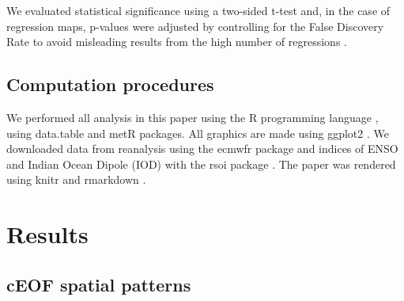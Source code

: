 \documentclass[pdflatex,sn-basic]{sn-jnl}
\theoremstyle{thmstyleone}%
\theoremstyle{thmstyletwo}%
\theoremstyle{thmstylethree}%
\begin{document}
We evaluated statistical significance using a two-sided t-test and, in the case of regression maps, p-values were adjusted by controlling for the False Discovery Rate \citep{benjamini1995, wilks2016} to avoid misleading results from the high number of regressions \citep{walker1914, katz1991}.

\hypertarget{computation-procedures}{%
\subsection{Computation procedures}\label{computation-procedures}}

We performed all analysis in this paper using the R programming language \citep{rcoreteam2020}, using data.table \citep{dowle2020} and metR \citep{campitelli2020} packages.
All graphics are made using ggplot2 \citep{wickham2009}.
We downloaded data from reanalysis using the ecmwfr package \citep{hufkens2020} and indices of ENSO and Indian Ocean Dipole (IOD) with the rsoi package \citep{albers2020}.
The paper was rendered using knitr and rmarkdown \citep{xie2015, allaire2020}.

\hypertarget{results}{%
\section{Results}\label{results}}

\hypertarget{spatial}{%
\subsection{cEOF spatial patterns}\label{spatial}}
\end{document}
